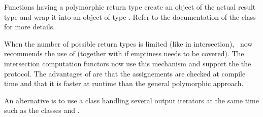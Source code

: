 Functions having a polymorphic return type create an object of the actual
result type and wrap it into an object of type .
Refer to the documentation of the 
class for more details.

When the number of possible return types is limited (like in intersection), \cgal\ now recommends the use of
 (together with 
if emptiness needs to be covered). The intersection computation functors now use this mechanism and support the
the  protocol. The advantages of  are that
the assignements are checked at compile time and that it is faster at runtime than the general polymorphic approach.

An alternative is to use a class handling several output iterators at the same time such as the classes
and
.

